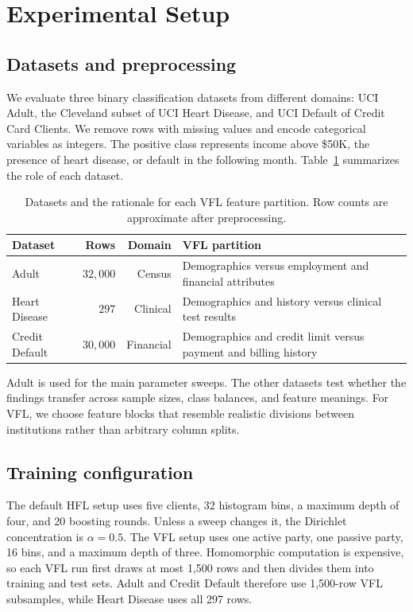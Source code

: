 \documentclass[11pt]{article}
\begin{document}
\section{Experimental Setup}
\label{sec:setup}

\subsection{Datasets and preprocessing}

We evaluate three binary classification datasets from different domains: UCI Adult, the Cleveland subset of UCI Heart Disease, and UCI Default of Credit Card Clients. We remove rows with missing values and encode categorical variables as integers. The positive class represents income above \$50K, the presence of heart disease, or default in the following month. Table~\ref{tab:datasets} summarizes the role of each dataset.

\begin{table}[htbp]
\centering
\caption{Datasets and the rationale for each VFL feature partition. Row counts are approximate after preprocessing.}
\begin{tabular}{lrrp{7.0cm}}
\toprule
Dataset & Rows & Domain & VFL partition \\
\midrule
Adult & $32{,}000$ & Census & Demographics versus employment and financial attributes \\
Heart Disease & $297$ & Clinical & Demographics and history versus clinical test results \\
Credit Default & $30{,}000$ & Financial & Demographics and credit limit versus payment and billing history \\
\bottomrule
\end{tabular}
\label{tab:datasets}
\end{table}

Adult is used for the main parameter sweeps. The other datasets test whether the findings transfer across sample sizes, class balances, and feature meanings. For VFL, we choose feature blocks that resemble realistic divisions between institutions rather than arbitrary column splits.

\subsection{Training configuration}

The default HFL setup uses five clients, 32 histogram bins, a maximum depth of four, and 20 boosting rounds. Unless a sweep changes it, the Dirichlet concentration is $\alpha=0.5$. The VFL setup uses one active party, one passive party, 16 bins, and a maximum depth of three. Homomorphic computation is expensive, so each VFL run first draws at most 1,500 rows and then divides them into training and test sets. Adult and Credit Default therefore use 1,500-row VFL subsamples, while Heart Disease uses all 297 rows.
\end{document}
